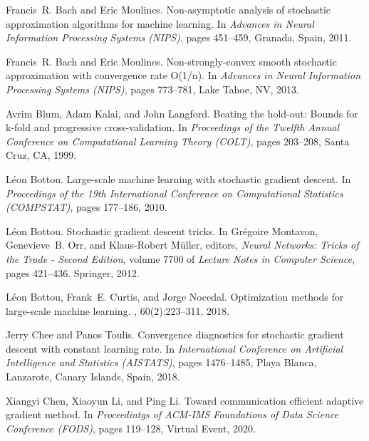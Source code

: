 \documentclass[conference]{IEEEtran}
\begin{document}
%
%


\begin{thebibliography}{10}

Francis~R. Bach and Eric Moulines.
\newblock Non-asymptotic analysis of stochastic approximation algorithms for
  machine learning.
\newblock In {\em Advances in Neural Information Processing Systems (NIPS)},
  pages 451--459, Granada, Spain, 2011.

Francis~R. Bach and Eric Moulines.
\newblock Non-strongly-convex smooth stochastic approximation with convergence
  rate {O}(1/n).
\newblock In {\em Advances in Neural Information Processing Systems (NIPS)},
  pages 773--781, Lake Tahoe, NV, 2013.

Avrim Blum, Adam Kalai, and John Langford.
\newblock Beating the hold-out: Bounds for k-fold and progressive
  cross-validation.
\newblock In {\em Proceedings of the Twelfth Annual Conference on Computational
  Learning Theory (COLT)}, pages 203--208, Santa Cruz, CA, 1999.

L{\'{e}}on Bottou.
\newblock Large-scale machine learning with stochastic gradient descent.
\newblock In {\em Proceedings of the 19th International Conference on
  Computational Statistics (COMPSTAT)}, pages 177--186,  2010.

L{\'{e}}on Bottou.
\newblock Stochastic gradient descent tricks.
\newblock In Gr{\'{e}}goire Montavon, Genevieve~B. Orr, and Klaus{-}Robert
  M{\"{u}}ller, editors, {\em Neural Networks: Tricks of the Trade - Second
  Edition}, volume 7700 of {\em Lecture Notes in Computer Science}, pages
  421--436. Springer, 2012.

L{\'{e}}on Bottou, Frank~E. Curtis, and Jorge Nocedal.
\newblock Optimization methods for large-scale machine learning.
, 60(2):223--311, 2018.

Jerry Chee and Panos Toulis.
\newblock Convergence diagnostics for stochastic gradient descent with constant
  learning rate.
\newblock In {\em International Conference on Artificial Intelligence and
  Statistics (AISTATS)}, pages 1476--1485, Playa Blanca, Lanzarote, Canary
  Islands, Spain, 2018.

Xiangyi Chen, Xiaoyun Li, and Ping Li.
\newblock Toward communication efficient adaptive gradient method.
\newblock In {\em Proceedintgs of {ACM-IMS} Foundations of Data Science
  Conference (FODS)}, pages 119--128, Virtual Event, 2020.


\end{thebibliography}
\end{document}
